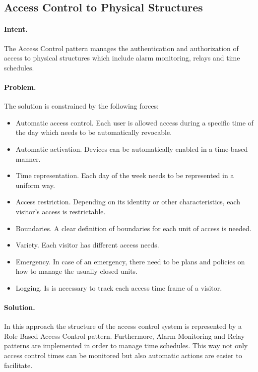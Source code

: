 \subsection{Access Control to Physical Structures~\cite{Fernandez2007}} 
\label{p:acp}

\paragraph{\textbf{Intent.}} The Access Control pattern manages the authentication and authorization of access to physical structures which include alarm monitoring, relays and time schedules.

\paragraph{\textbf{Problem.}} The solution is constrained by the following forces:
\begin{itemize}
	\item Automatic access control. Each user is allowed access during a specific time of the day which needs to be automatically revocable.
	\item Automatic activation. Devices can be automatically enabled in a time-based manner. 
	\item Time representation. Each day of the week needs to be represented in a uniform way. 
	\item Access restriction. Depending on its identity or other characteristics, each visitor's access is restrictable.
	\item Boundaries. A clear definition of boundaries for each unit of access is needed.
	\item Variety. Each visitor has different access needs.
	\item Emergency. In case of an emergency, there need to be plans and policies on how to manage the usually closed units.
	\item Logging. Is is necessary to track each access time frame of a visitor.
\end{itemize}

\paragraph{\textbf{Solution.}} In this approach the structure of the access control system is represented by a Role Based Access Control pattern. Furthermore, Alarm Monitoring and Relay patterns are implemented in order to manage time schedules. This way not only access control times can be monitored but also automatic actions are easier to facilitate.


